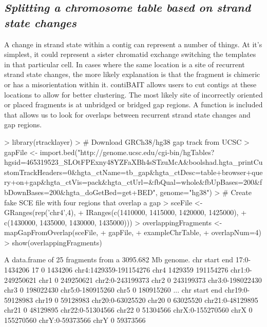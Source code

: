 \documentclass{article}
\begin{document}
\subsection{\textit{Splitting a chromosome table based on strand state changes}}
A change in strand state within a contig can represent a number of things. At it's simplest, it could represent a sister chromatid exchange switching the templates in that particular cell. In cases where the same location is a site of recurrent strand state changes, the more likely explanation is that the fragment is chimeric or has a misorientation within it. contiBAIT allows users to cut contigs at these locations to allow for better clustering. The most likely site of incorrectly oriented or placed fragments is at unbridged or bridged gap regions. A function is included that allows us to look for overlaps between recurrent strand state changes and gap regions.

\begin{Schunk}
\begin{Sinput}
> library(rtracklayer)
> # Download GRCh38/hg38 gap track from UCSC
> gapFile <- import.bed("http://genome.ucsc.edu/cgi-bin/hgTables?hgsid=465319523_SLOtFPExny48YZFaXBh4sSTzuMcA&boolshad.hgta_printCustomTrackHeaders=0&hgta_ctName=tb_gap&hgta_ctDesc=table+browser+query+on+gap&hgta_ctVis=pack&hgta_ctUrl=&fbQual=whole&fbUpBases=200&fbDownBases=200&hgta_doGetBed=get+BED", genome="hg38")
> # Create fake SCE file with four regions that overlap a gap
> sceFile <- GRanges(rep('chr4',4), 
+ IRanges(c(1410000, 1415000, 1420000, 1425000), 
+ c(1430000, 1435000, 1430000, 1435000)))
> overlappingFragments <- mapGapFromOverlap(sceFile,
+  gapFile, 
+  exampleChrTable, 
+  overlapNum=4)
> show(overlappingFragments)
\end{Sinput}
\begin{Soutput}
A data.frame of 25 fragments from a 3095.682 Mb genome.
                        chr   start       end
17:0-1434206             17       0   1434206
chr4:1429359-191154276 chr4 1429359 191154276
chr1:0-249250621       chr1       0 249250621
chr2:0-243199373       chr2       0 243199373
chr3:0-198022430       chr3       0 198022430
chr5:0-180915260       chr5       0 180915260
...
                   chr start       end
chr19:0-59128983 chr19     0  59128983
chr20:0-63025520 chr20     0  63025520
chr21:0-48129895 chr21     0  48129895
chr22:0-51304566 chr22     0  51304566
chrX:0-155270560  chrX     0 155270560
chrY:0-59373566   chrY     0  59373566
\end{Soutput}
\end{Schunk}
\end{document}
